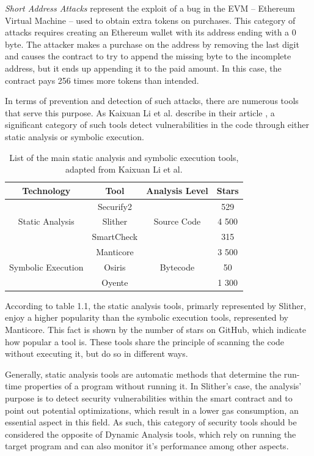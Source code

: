 \textit{Short Address Attacks} \cite{blockchainAttacks} represent the exploit of a bug in the EVM – Ethereum Virtual Machine – used to obtain extra tokens on purchases. This category of attacks requires creating an Ethereum wallet with its address ending with a 0 byte. The attacker makes a purchase on the address by removing the last digit and causes the contract to try to append the missing byte to the incomplete address, but it ends up appending it to the paid amount. In this case, the contract pays 256 times more tokens than intended. 

In terms of prevention and detection of such attacks, there are numerous tools that serve this purpose. As Kaixuan Li et al. describe in their article \cite{staticAnalysisToolsComparison}, a significant category of such tools detect vulnerabilities in the code through either static analysis or symbolic execution.


\begin{table}[h]
\centering
\begin{tabular}{cccc}
\hline
Technology         & Tool       & Analysis Level & Stars \\ \hline
                   & Securify2  &                & 529   \\
Static Analysis    & Slither    & Source Code    & 4 500 \\
                   & SmartCheck &                & 315   \\ \hline
                   & Manticore  &                & 3 500 \\
Symbolic Execution & Osiris     & Bytecode       & 50    \\
                   & Oyente     &                & 1 300 \\ \hline
\end{tabular}
\caption{List of the main static analysis and symbolic execution tools, adapted from Kaixuan Li et al. \cite{staticAnalysisToolsComparison}}
\end{table}

According to table 1.1, the static analysis tools, primarly represented by Slither, enjoy a higher popularity than the symbolic execution tools, represented by Manticore. This fact is shown by the number of stars on GitHub, which indicate how popular a tool is. These tools share the principle of scanning the code without executing it, but do so in different ways.

Generally, static analysis tools \cite{staticAnalysisDef} are automatic methods that determine the run-time properties of a program without running it. In Slither's \cite{slither} case, the analysis' purpose is to detect security vulnerabilities within the smart contract and to point out potential optimizations, which result in a lower gas consumption, an essential aspect in this field. As such, this category of security tools should be considered the opposite of Dynamic Analysis tools, which rely on running the target program and can also monitor it's performance among other aspects.

